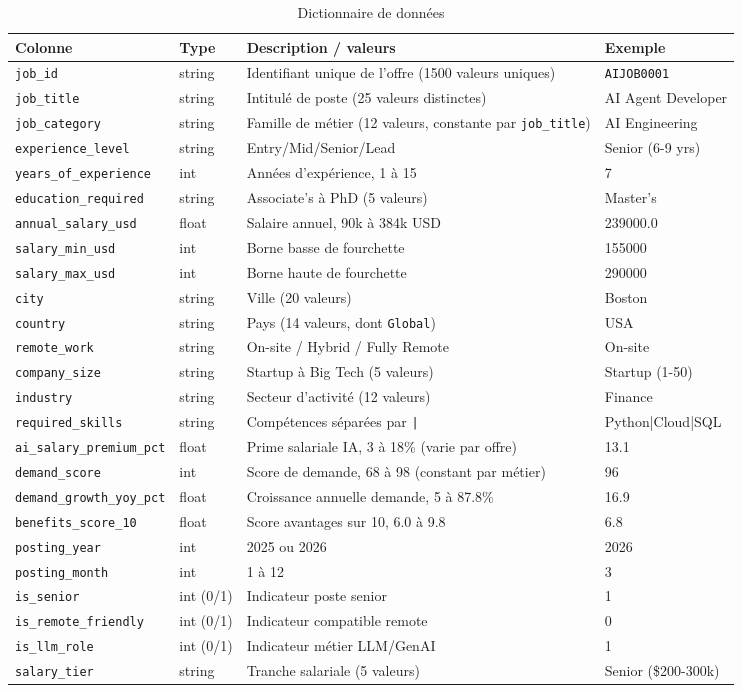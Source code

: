 \begin{longtable}{p{3cm}p{1.3cm}p{5.5cm}p{2.8cm}}
\caption{Dictionnaire de données} \\
\toprule
Colonne & Type & Description / valeurs & Exemple \\
\midrule
\endhead
\texttt{job\_id} & string & Identifiant unique de l'offre (1500 valeurs uniques) & \texttt{AIJOB0001} \\
\texttt{job\_title} & string & Intitulé de poste (25 valeurs distinctes) & AI Agent Developer \\
\texttt{job\_category} & string & Famille de métier (12 valeurs, constante par \texttt{job\_title}) & AI Engineering \\
\texttt{experience\_level} & string & Entry/Mid/Senior/Lead & Senior (6-9 yrs) \\
\texttt{years\_of\_experience} & int & Années d'expérience, 1 à 15 & 7 \\
\texttt{education\_required} & string & Associate's à PhD (5 valeurs) & Master's \\
\texttt{annual\_salary\_usd} & float & Salaire annuel, 90k à 384k USD & 239000.0 \\
\texttt{salary\_min\_usd} & int & Borne basse de fourchette & 155000 \\
\texttt{salary\_max\_usd} & int & Borne haute de fourchette & 290000 \\
\texttt{city} & string & Ville (20 valeurs) & Boston \\
\texttt{country} & string & Pays (14 valeurs, dont \texttt{Global}) & USA \\
\texttt{remote\_work} & string & On-site / Hybrid / Fully Remote & On-site \\
\texttt{company\_size} & string & Startup à Big Tech (5 valeurs) & Startup (1-50) \\
\texttt{industry} & string & Secteur d'activité (12 valeurs) & Finance \\
\texttt{required\_skills} & string & Compétences séparées par \texttt{|} & Python|Cloud|SQL \\
\texttt{ai\_salary\_premium\_pct} & float & Prime salariale IA, 3 à 18\% (varie par offre) & 13.1 \\
\texttt{demand\_score} & int & Score de demande, 68 à 98 (constant par métier) & 96 \\
\texttt{demand\_growth\_yoy\_pct} & float & Croissance annuelle demande, 5 à 87.8\% & 16.9 \\
\texttt{benefits\_score\_10} & float & Score avantages sur 10, 6.0 à 9.8 & 6.8 \\
\texttt{posting\_year} & int & 2025 ou 2026 & 2026 \\
\texttt{posting\_month} & int & 1 à 12 & 3 \\
\texttt{is\_senior} & int (0/1) & Indicateur poste senior & 1 \\
\texttt{is\_remote\_friendly} & int (0/1) & Indicateur compatible remote & 0 \\
\texttt{is\_llm\_role} & int (0/1) & Indicateur métier LLM/GenAI & 1 \\
\texttt{salary\_tier} & string & Tranche salariale (5 valeurs) & Senior (\$200-300k) \\
\bottomrule
\end{longtable}
